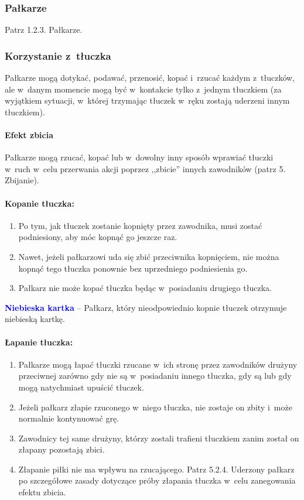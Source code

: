 \documentclass[12pt,a4paper]{article}
\newcommand\bluecard[1]{\bgroup\textcolor{blue}{\textbf{#1}}}
\begin{document}
\subsubsection{Pałkarze}
Patrz 1.2.3. Pałkarze.

\subsubsection{Korzystanie z~tłuczka}

Pałkarze mogą dotykać, podawać, przenosić, kopać i~rzucać każdym z~tłuczków, ale w~danym momencie mogą być w~kontakcie tylko z~jednym
tłuczkiem (za wyjątkiem sytuacji, w~której trzymając tłuczek w~ręku
zostają uderzeni innym tłuczkiem).

\paragraph{Efekt zbicia}
Pałkarze mogą rzucać, kopać lub w~dowolny inny sposób wprawiać tłuczki w~ruch w~celu przerwania akcji
poprzez ,,zbicie'' innych zawodników (patrz 5. Zbijanie).

\paragraph{Kopanie tłuczka:}

\begin{enumerate}
	\item
	      Po tym, jak tłuczek zostanie kopnięty przez zawodnika, musi zostać podniesiony, aby móc kopnąć go jeszcze raz.
	\item
	      Nawet, jeżeli pałkarzowi uda się zbić przeciwnika kopnięciem, nie
	      można kopnąć tego tłuczka ponownie bez uprzedniego podniesienia go.
	\item
	      Pałkarz nie może kopać tłuczka będąc w~posiadaniu drugiego tłuczka.
\end{enumerate}

\bluecard{Niebieska kartka} -- Pałkarz, który nieodpowiednio kopnie tłuczek
otrzymuje niebieską kartkę.

\paragraph{Łapanie tłuczka:}

\begin{enumerate}
	\item
	      Pałkarze mogą łapać tłuczki rzucane w~ich stronę przez zawodników
	      drużyny przeciwnej zarówno gdy nie są w~posiadaniu innego
	      tłuczka, gdy są lub gdy mogą natychmiast upuścić tłuczek.
	\item
	      Jeżeli pałkarz złapie rzuconego w~niego tłuczka, nie zostaje on zbity
	      i~może normalnie kontynuować grę.
	\item
	      Zawodnicy tej same drużyny, którzy zostali trafieni tłuczkiem zanim
	      został on złapany pozostają zbici.
	\item
	      Złapanie piłki nie ma wpływu na rzucającego. Patrz 5.2.4. Uderzony
	      pałkarz po szczegółowe zasady dotyczące próby złapania tłuczka w~celu
	      zanegowania efektu zbicia.
\end{enumerate}
\end{document}
